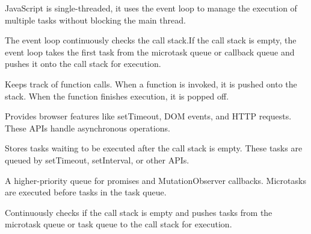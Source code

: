 JavaScript is single-threaded, it uses the event loop to manage the execution of multiple tasks without blocking the main thread.


The event loop continuously checks the call stack.If the call stack is empty, the event loop takes the first task from the microtask queue or callback queue and pushes it onto the call stack for execution.

  Keeps track of function calls. When a function is invoked, it is pushed onto the stack. When the function finishes execution, it is popped off.

  Provides browser features like setTimeout, DOM events, and HTTP requests. These APIs handle asynchronous operations.

  Stores tasks waiting to be executed after the call stack is empty. These tasks are queued by setTimeout, setInterval, or other APIs.

   A higher-priority queue for promises and MutationObserver callbacks. Microtasks are executed before tasks in the task queue.

   Continuously checks if the call stack is empty and pushes tasks from the microtask queue or task queue to the call stack for execution.